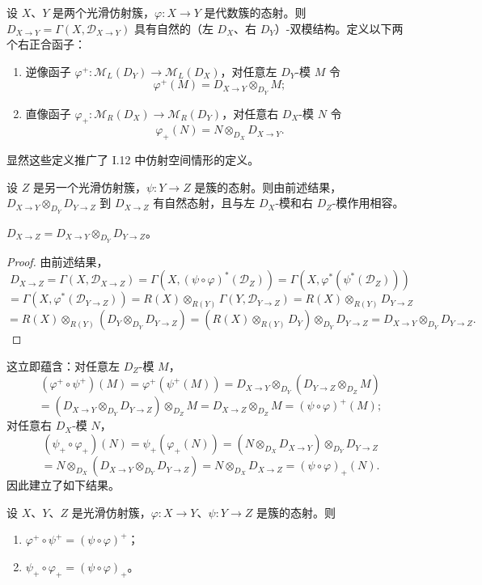 设 $X$、$Y$ 是两个光滑仿射簇，$\varphi:X\to Y$ 是代数簇的态射。则
$D_{X\to Y}=\Gamma(X,\mathcal{D}_{X\to Y})$ 具有自然的（左 $D_X$、右 $D_Y$）-双模结构。定义以下两个右正合函子：

\begin{enumerate}[label=(\roman*)]
  \item 逆像函子 $\varphi^+:\mathcal{M}_L(D_Y)\to\mathcal{M}_L(D_X)$，对任意左 $D_Y$-模 $M$ 令
    $$\varphi^+(M)=D_{X\to Y}\otimes_{D_Y}M;$$
  \item 直像函子 $\varphi_+:\mathcal{M}_R(D_X)\to\mathcal{M}_R(D_Y)$，对任意右 $D_X$-模 $N$ 令
    $$\varphi_+(N)=N\otimes_{D_X}D_{X\to Y}.$$
\end{enumerate}
显然这些定义推广了 I.12 中仿射空间情形的定义。

设 $Z$ 是另一个光滑仿射簇，$\psi:Y\to Z$ 是簇的态射。则由前述结果，$D_{X\to Y}\otimes_{D_Y}D_{Y\to Z}$ 到 $D_{X\to Z}$ 有自然态射，且与左 $D_X$-模和右 $D_Z$-模作用相容。

\begin{proposition}\label{prop:4.2.1}
$D_{X\to Z}=D_{X\to Y}\otimes_{D_Y}D_{Y\to Z}$。
\end{proposition}

\begin{proof}
由前述结果，
$$D_{X\to Z}=\Gamma(X,\mathcal{D}_{X\to Z})=\Gamma(X,(\psi\circ\varphi)^*(\mathcal{D}_Z))
=\Gamma(X,\varphi^*(\psi^*(\mathcal{D}_Z)))$$
$$=\Gamma(X,\varphi^*(\mathcal{D}_{Y\to Z}))=R(X)\otimes_{R(Y)}\Gamma(Y,\mathcal{D}_{Y\to Z})
=R(X)\otimes_{R(Y)}D_{Y\to Z}$$
$$=R(X)\otimes_{R(Y)}(D_Y\otimes_{D_Y}D_{Y\to Z})
=(R(X)\otimes_{R(Y)}D_Y)\otimes_{D_Y}D_{Y\to Z}=D_{X\to Y}\otimes_{D_Y}D_{Y\to Z}.$$
\end{proof}

这立即蕴含：对任意左 $D_Z$-模 $M$，
$$(\varphi^+\circ\psi^+)(M)=\varphi^+(\psi^+(M))=D_{X\to Y}\otimes_{D_Y}(D_{Y\to Z}\otimes_{D_Z}M)$$
$$=(D_{X\to Y}\otimes_{D_Y}D_{Y\to Z})\otimes_{D_Z}M=D_{X\to Z}\otimes_{D_Z}M=(\psi\circ\varphi)^+(M);$$
对任意右 $D_X$-模 $N$，
$$(\psi_+\circ\varphi_+)(N)=\psi_+(\varphi_+(N))=(N\otimes_{D_X}D_{X\to Y})\otimes_{D_Y}D_{Y\to Z}$$
$$=N\otimes_{D_X}(D_{X\to Y}\otimes_{D_Y}D_{Y\to Z})=N\otimes_{D_X}D_{X\to Z}=(\psi\circ\varphi)_+(N).$$
因此建立了如下结果。

\begin{theorem}\label{thm:4.2.2}
设 $X$、$Y$、$Z$ 是光滑仿射簇，$\varphi:X\to Y$、$\psi:Y\to Z$ 是簇的态射。则
\begin{enumerate}[label=(\roman*)]
  \item $\varphi^+\circ\psi^+=(\psi\circ\varphi)^+$；
  \item $\psi_+\circ\varphi_+=(\psi\circ\varphi)_+$。
\end{enumerate}
\end{theorem}

